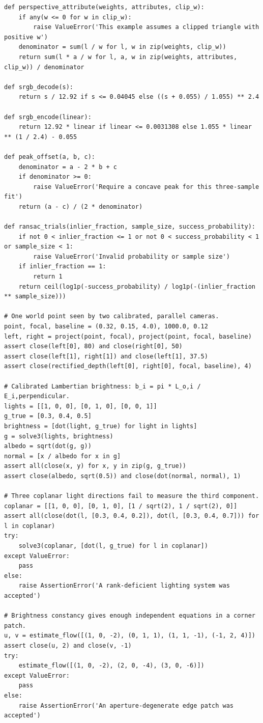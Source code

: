 \begin{verbatim}
def perspective_attribute(weights, attributes, clip_w):
    if any(w <= 0 for w in clip_w):
        raise ValueError('This example assumes a clipped triangle with positive w')
    denominator = sum(l / w for l, w in zip(weights, clip_w))
    return sum(l * a / w for l, a, w in zip(weights, attributes, clip_w)) / denominator

def srgb_decode(s):
    return s / 12.92 if s <= 0.04045 else ((s + 0.055) / 1.055) ** 2.4

def srgb_encode(linear):
    return 12.92 * linear if linear <= 0.0031308 else 1.055 * linear ** (1 / 2.4) - 0.055

def peak_offset(a, b, c):
    denominator = a - 2 * b + c
    if denominator >= 0:
        raise ValueError('Require a concave peak for this three-sample fit')
    return (a - c) / (2 * denominator)

def ransac_trials(inlier_fraction, sample_size, success_probability):
    if not 0 < inlier_fraction <= 1 or not 0 < success_probability < 1 or sample_size < 1:
        raise ValueError('Invalid probability or sample size')
    if inlier_fraction == 1:
        return 1
    return ceil(log1p(-success_probability) / log1p(-(inlier_fraction ** sample_size)))

# One world point seen by two calibrated, parallel cameras.
point, focal, baseline = (0.32, 0.15, 4.0), 1000.0, 0.12
left, right = project(point, focal), project(point, focal, baseline)
assert close(left[0], 80) and close(right[0], 50)
assert close(left[1], right[1]) and close(left[1], 37.5)
assert close(rectified_depth(left[0], right[0], focal, baseline), 4)

# Calibrated Lambertian brightness: b_i = pi * L_o,i / E_i,perpendicular.
lights = [[1, 0, 0], [0, 1, 0], [0, 0, 1]]
g_true = [0.3, 0.4, 0.5]
brightness = [dot(light, g_true) for light in lights]
g = solve3(lights, brightness)
albedo = sqrt(dot(g, g))
normal = [x / albedo for x in g]
assert all(close(x, y) for x, y in zip(g, g_true))
assert close(albedo, sqrt(0.5)) and close(dot(normal, normal), 1)

# Three coplanar light directions fail to measure the third component.
coplanar = [[1, 0, 0], [0, 1, 0], [1 / sqrt(2), 1 / sqrt(2), 0]]
assert all(close(dot(l, [0.3, 0.4, 0.2]), dot(l, [0.3, 0.4, 0.7])) for l in coplanar)
try:
    solve3(coplanar, [dot(l, g_true) for l in coplanar])
except ValueError:
    pass
else:
    raise AssertionError('A rank-deficient lighting system was accepted')

# Brightness constancy gives enough independent equations in a corner patch.
u, v = estimate_flow([(1, 0, -2), (0, 1, 1), (1, 1, -1), (-1, 2, 4)])
assert close(u, 2) and close(v, -1)
try:
    estimate_flow([(1, 0, -2), (2, 0, -4), (3, 0, -6)])
except ValueError:
    pass
else:
    raise AssertionError('An aperture-degenerate edge patch was accepted')


\end{verbatim}
